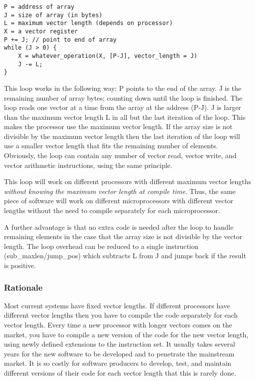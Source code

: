 \documentclass[forwardcom.tex]{subfiles}
\begin{document}
\begin{lstlisting}[frame=single]
P = address of array
J = size of array (in bytes)
L = maximum vector length (depends on processor)
X = a vector register
P += J; // point to end of array
while (J > 0) {
    X = whatever_operation(X, [P-J], vector_length = J)
    J -= L;
}
\end{lstlisting}
\vv

This loop works in the following way: P points to the end of the array. J is the remaining number of array bytes; counting down until the loop is finished. The loop reads one vector at a time from the array at the address (P-J). J is larger than the maximum vector length L in all but the last iteration of the loop. This makes the processor use the maximum vector length. If the array size is not divisible by the maximum vector length then the last iteration of the loop will use a smaller vector length that fits the remaining number of elements. Obviously, the loop can contain any number of vector read, vector write, and vector arithmetic instructions, using the same principle. 
\vv

This loop will work on different processors with different maximum vector lengths \textit{without knowing the maximum vector length at compile time}. Thus, the same piece of software will work on different microprocessors with different vector lengths without the need to compile separately for each microprocessor. 
\vv

A further advantage is that no extra code is needed after the loop to handle remaining elements in the case that the array size is not divisible by the vector length.
The loop overhead can be reduced to a single instruction (sub\_maxlen/jump\_pos) which subtracts L from 
J and jumps back if the result is positive.

\subsubsection{Rationale}
Most current systems have fixed vector lengths. If different processors have different vector lengths then you have to compile the code separately for each vector length. Every time a new processor with longer vectors comes on the market, you have to compile a new version of the code for the new vector length, using newly defined extensions to the instruction set. It usually takes several years for the new software to be developed and to penetrate the mainstream market. It is so costly for software producers to develop, test, and maintain different versions of their code for each vector length that this is rarely done.
\vv
\end{document}

